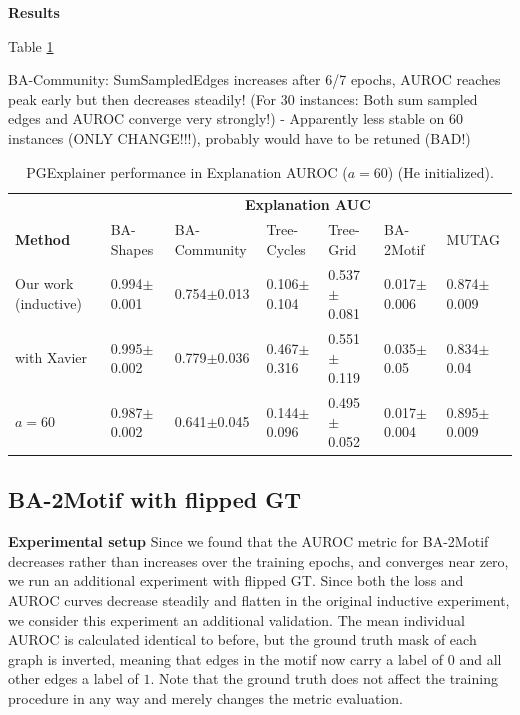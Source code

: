 \textbf{Results}\par
Table \ref{tab:experiment_60train}

BA-Community: SumSampledEdges increases after 6/7 epochs, AUROC reaches peak early but then decreases steadily! (For 30 instances: Both sum sampled edges and AUROC converge very strongly!) - Apparently less stable on 60 instances (ONLY CHANGE!!!), probably would have to be retuned (BAD!)
\begin{table}[ht]
    \centering
    \scriptsize
    \begin{tabularx}{\textwidth}{l*{6}{X}}   %
    \toprule
    \textbf{} & \multicolumn{6}{c}{\textbf{Explanation AUC}} \\
    \cmidrule{2-7}
    \textbf{Method} & BA-Shapes & BA-Community & Tree-Cycles & Tree-Grid & BA-2Motif & MUTAG \\
    \midrule
    Our work (inductive) & 0.994$\pm$0.001 & 0.754$\pm$0.013 & 0.106$\pm$0.104 & 0.537$\pm$0.081 & 0.017$\pm$0.006 & 0.874$\pm$0.009 \\
    \midrule
    with Xavier & 0.995$\pm$0.002 & 0.779$\pm$0.036 & 0.467$\pm$0.316 & 0.551$\pm$0.119 & 0.035$\pm$0.05 & 0.834$\pm$0.04 \\
    \midrule
    $a=60$ & 0.987$\pm$0.002 & 0.641$\pm$0.045 & 0.144$\pm$0.096 & 0.495$\pm$0.052 & 0.017$\pm$0.004 & 0.895$\pm$0.009 \\
    \bottomrule
    \end{tabularx}
    \caption[Inductive performance with 60 training instances]{PGExplainer performance in Explanation AUROC ($a=60$) (He initialized).}
    \label{tab:experiment_60train}
\end{table}

\subsection{BA-2Motif with flipped GT}

\textbf{Experimental setup}
Since we found that the AUROC metric for BA-2Motif decreases rather than increases over the training epochs, and converges near zero, we run an additional experiment with flipped GT. Since both the loss and AUROC curves decrease steadily and flatten in the original inductive experiment, we consider this experiment an additional validation.
The mean individual AUROC is calculated identical to before, but the ground truth mask of each graph is inverted, meaning that edges in the motif now carry a label of $0$ and all other edges a label of $1$. 
Note that the ground truth does not affect the training procedure in any way and merely changes the metric evaluation. \bigskip

